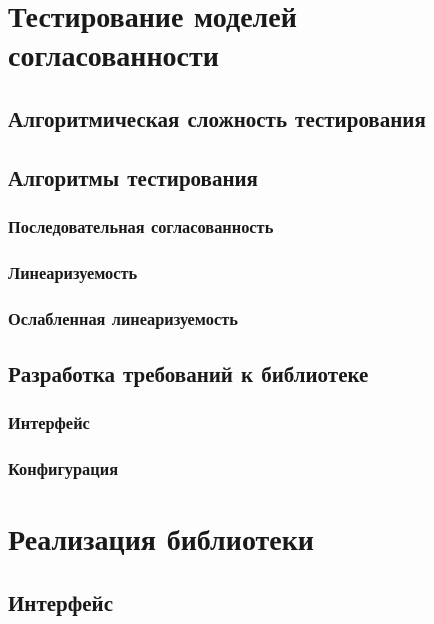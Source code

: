 \documentclass[14pt, openany]{book}
\begin{document}
\chapter{Тестирование моделей согласованности}

\section{Алгоритмическая сложность тестирования}

\section{Алгоритмы тестирования}

\subsection{Последовательная согласованность}

\subsection{Линеаризуемость}

\subsection{Ослабленная линеаризуемость}

\section{Разработка требований к библиотеке}

\subsection{Интерфейс}

\subsection{Конфигурация}

\chapter{Реализация библиотеки}

\section{Интерфейс}
\end{document}
